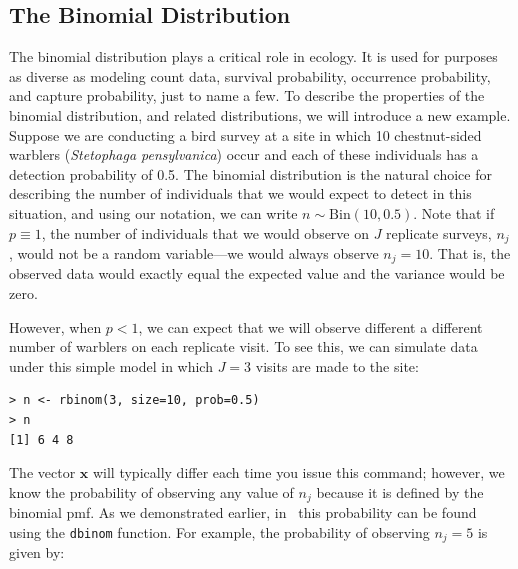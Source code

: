\subsection{The Binomial Distribution}

The binomial distribution plays a critical role in ecology. It is
used for purposes as diverse as modeling count data, survival
probability, occurrence probability, and capture probability, just to
name a few.
To describe the properties of the binomial distribution, and related
distributions, we will introduce a new example.
Suppose we are conducting a bird survey at a site in which 10
chestnut-sided warblers (\textit{Stetophaga pensylvanica}) occur and
each of these individuals has a detection probability of 0.5. The
binomial distribution is the natural choice for describing the number
of individuals that we would expect to detect in this
situation, and using our notation, we can write
$n \sim \text{Bin}(10, 0.5)$. Note that if $p \equiv 1$, the number of
individuals that we would observe on $J$ replicate surveys, $n_j$,
would not be a random variable---we would always observe
$n_j=10$. That is, the observed data would exactly equal the expected
value and the variance would be zero.

However, when $p<1$, we can expect that we will observe different
a different number of warblers on each replicate visit. To see this,
we can simulate data under this simple model in which $J=3$ visits are
made to the site:
\begin{verbatim}
> n <- rbinom(3, size=10, prob=0.5)
> n
[1] 6 4 8
\end{verbatim}
The vector $\mathbf{x}$ will typically differ each time you issue this
command; however, we know the probability of observing any value of
$n_j$ because it is defined by the binomial pmf. As we demonstrated
earlier, in \R~this probability can be found using the \verb+dbinom+
function. For example, the probability of observing $n_j=5$ is given by:

